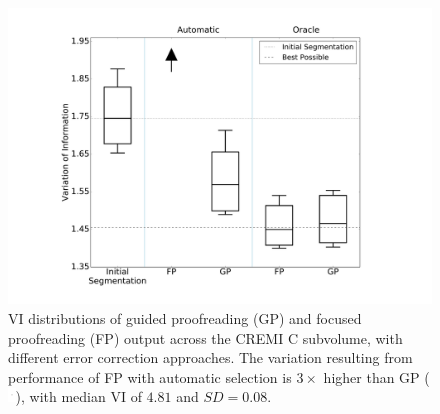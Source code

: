 \begin{figure}[t]
\centering
\includegraphics[width=\linewidth]{gfx/cremiCboxplot.pdf}
\caption{VI distributions of guided proofreading (GP) and focused proofreading (FP) output across the CREMI C subvolume, with different error correction approaches. The variation resulting from performance of FP with automatic selection is $3\times$ higher than GP (\protect\includegraphics[width=0.2cm]{gfx/arrow.pdf}), with median VI of $4.81$ and $SD=0.08$.}
\label{fig:cremiCboxplot}
\end{figure}
